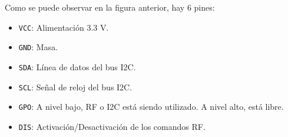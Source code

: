 Como se puede observar en la figura anterior, hay 6 pines:

\begin{itemize}
    \item \texttt{VCC}: Alimentación 3.3 V.
    \item \texttt{GND}: Masa.
    \item \texttt{SDA}: Línea de datos del bus I2C.
    \item \texttt{SCL}: Señal de reloj del bus I2C.
    \item \texttt{GPO}: A nivel bajo, RF o I2C está siendo utilizado. A nivel alto, está libre.
    \item \texttt{DIS}: Activación/Desactivación de los comandos RF.
\end{itemize}
